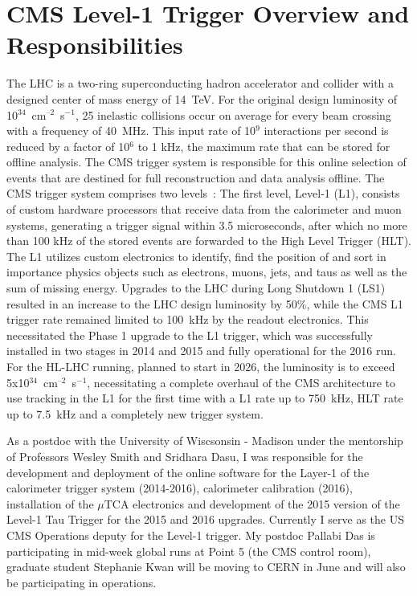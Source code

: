 \documentclass[preprint,12pt]{elsarticle}
\begin{document}
\section{CMS Level-1 Trigger Overview and Responsibilities}
The LHC is a two-ring superconducting hadron accelerator and collider with a designed center 
of mass energy of 14~TeV. For the original design luminosity of 10$^{34}$~cm$^{–2}$~s$^{-1}$,
25 inelastic collisions occur on average for every beam crossing with a frequency of 40~MHz.
This input rate of 10$^9$ interactions per second is reduced by a factor of 10$^6$ to 1 kHz,
the maximum rate that can be stored for offline analysis. 
The CMS trigger system is responsible for this online selection of events that are destined for full 
reconstruction and data analysis offline. The CMS trigger system comprises two levels~\cite{Khachatryan:2016bia}: 
The first level, Level-1 (L1), consists of custom hardware processors that receive data from the calorimeter and muon 
systems, generating a trigger signal within 3.5 microseconds, after which
no more than 100 kHz of the stored events are forwarded to the High Level Trigger (HLT). The L1 utilizes
custom electronics to identify, find the position of and sort in importance physics objects such as
electrons, muons, jets, and taus as well as the sum of missing energy. Upgrades to the LHC during Long Shutdown 1 (LS1)
resulted in an increase to the LHC design luminosity by 50\%, while the CMS L1 trigger rate
remained limited to 100~kHz by the readout electronics. This necessitated the Phase 1 upgrade 
to the L1 trigger,
which was successfully installed in two stages in 2014 and 2015 and fully operational for 
the 2016 run. For the
HL-LHC running, planned to start in 2026, the luminosity is to exceed 5x10$^{34}$~cm$^{–2}$~s$^{-1}$,
necessitating a complete overhaul of the CMS architecture to use tracking in the L1 for the first time
with a L1 rate up to 750~kHz, HLT rate up to 7.5~kHz and a completely new trigger system.

As a postdoc with the University of Wiscsonsin - Madison under the mentorship of Professors Wesley Smith
and Sridhara Dasu, I was responsible for the development and deployment of the online software for the 
Layer-1 of the calorimeter trigger system (2014-2016), calorimeter calibration (2016), installation of 
the $\mu$TCA electronics and development of the 2015 version of the Level-1 Tau Trigger for the 2015 and 2016 
upgrades. Currently I serve as the US CMS Operations deputy for the Level-1 trigger. My postdoc
Pallabi Das is participating in mid-week global runs at Point 5 (the CMS control room), graduate student
Stephanie Kwan will be moving to CERN in June and will also be participating in operations.
\end{document}
